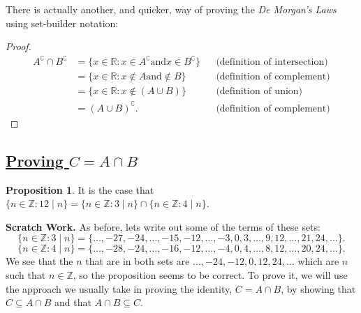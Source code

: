 \documentclass{amsart} %
\theoremstyle{definition} %
\theoremstyle{definition}
\newtheorem*{prpn}{Proposition}
\theoremstyle{remark} %
\begin{document}
There is actually another, and quicker, way of proving the \emph{De Morgan's Laws} using set-builder notation:

\begin{proof}
      \begin{align*} %
            A^\complement \cap B^\complement
            &= \{x \in \mathbb{R}: x \in A^\complement \text{and} x\in B^\complement \} && \text{(definition of intersection)} \\
            &= \{x \in \mathbb{R}: x \not\in A \text{and} \not\in B \} && \text{(definition of complement)} \\
            &= \{x \in \mathbb{R}: x \not\in (A \cup B) \} && \text{(definition of union)} \\
            &= (A \cup B)^\complement. && \text{(definition of complement)}
      \end{align*}
\end{proof}












\bigskip \bigskip \bigskip \bigskip

\subsection{\underline{Proving $C = A \cap B$}}

\begin{prpn}
      It is the case that $\{n \in \mathbb{Z}: 12\mid n \} = \{n \in \mathbb{Z}: 3\mid n \} \cap \{n \in \mathbb{Z}: 4\mid n \}$.
\end{prpn}

\noindent \textbf{Scratch Work.} As before, lets write out some of the terms of these sets:
                  \[ \{n \in \mathbb{Z}:3\mid n \} = \{\dots, -27, -24, \dots, -15, -12, \dots, -3, 0, 3, \dots, 9, 12, \dots, 21, 24, \dots \}. \]
                  \[ \{n \in \mathbb{Z}:4\mid n \} = \{\dots, -28, -24, \dots, -16, -12, \dots, -4, 0, 4, \dots, 8, 12, \dots, 20, 24, \dots \}. \]
                  \indent We see that the $n$ that are in both sets are $\dots, -24, -12, 0, 12, 24, \dots$ which are $n$ such that $n \in \mathbb{Z}$, so the proposition seems to be correct. To prove it, we will use the approach we usually take in proving the identity, $C = A \cap B$, by showing that $C \subseteq A \cap B$ and that $A \cap B \subseteq C$.
\end{document}
